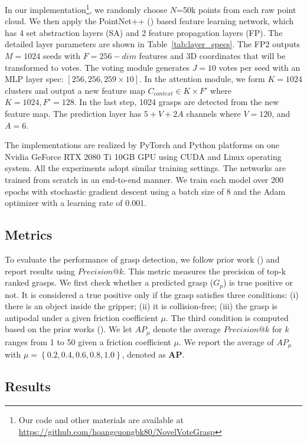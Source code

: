 In our implementation\footnote{Our code and other materials are available at \url{https://github.com/hoangcuongbk80/NovelVoteGrasp}}, we randomly choose $N$=50k points from each raw point cloud. We then apply the PointNet++ (\textcolor{cyan}{\cite{qi2017pointnet++}}) based feature learning network, which has 4 set abstraction layers (SA) and 2 feature propagation layers (FP). The detailed layer parameters are shown in Table~\ref{tab:layer_specs}. The FP2 outputs $M=1024$ seeds with $F=256-dim$ features and 3D coordinates that will be transformed to votes. The voting module generates $J=10$ votes per seed with an MLP layer spec: $[256, 256, 259 \times 10]$. In the attention module, we form $K=1024$ clusters and output a new feature map $C_{context} \in K \times F'$ where $K=1024, F'=128$. In the last step, 1024 grasps are detected from the new feature map. The prediction layer has $5 + V + 2A$ channels where $V=120$, and $A=6$.

The implementations are realized by PyTorch and Python platforms on one Nvidia GeForce RTX 2080 Ti 10GB GPU using CUDA and Linux operating system. All the experiments adopt similar training settings. The networks are trained from scratch in an end-to-end manner. We train each model over 200 epochs with stochastic gradient descent using a batch size of 8 and the Adam optimizer with a learning rate of 0.001.

\subsection{Metrics}

To evaluate the performance of grasp detection, we follow prior work (\textcolor{cyan}{\cite{fang2020graspnet}}) and report results using $Precision@k$. This metric measures the precision of top-k ranked grasps. We first check whether a predicted grasp ($G_{p}$) is true positive or not. It is considered a true positive only if the grasp satisfies three conditions: (i) there is an object inside the gripper; (ii) it is collision-free; (iii) the grasp is antipodal under a given friction coefficient $\mu$. The third condition is computed based on the prior works (\textcolor{cyan}{\cite{ten2017grasp, fang2020graspnet}}). We let $AP_{\mu}$ denote the average $Precision@k$ for $k$ ranges from 1 to 50 given a friction coefficient $\mu$. We report the average of $AP_{\mu}$ with $\mu = \left\lbrace 0.2,0.4,0.6,0.8,1.0 \right\rbrace $, denoted as \textbf{AP}.

\subsection{Results}

